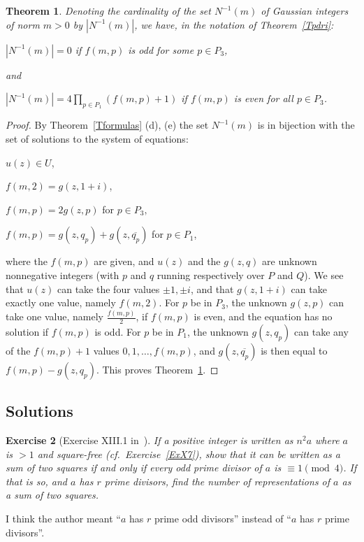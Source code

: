 \documentclass[12pt,letterpaper]{article}
\newtheorem{thm}{Theorem}%
\newtheorem{exer}[thm]{Exercise}
\theoremstyle{definition}
\begin{document}
\begin{thm}\label{TN-1m}
Denoting the cardinality of the set $N^{-1}(m)$ of Gaussian integers of norm $m>0$ by $|N^{-1}(m)|$, we have, in the notation of Theorem~\ref{Tpdri}: 

$|N^{-1}(m)|=0$ if $f(m,p)$ is odd for some $p\in P_3$, 

\noindent and 

$\displaystyle |N^{-1}(m)| = 4 \prod_{p\in P_1} (f(m,p)+1)$ if $f(m,p)$ is even for all $p\in P_3$. 
\end{thm}

\begin{proof}
By Theorem~\ref{Tformulas} (d), (e) the set $N^{-1}(m)$ is in bijection with the set of solutions to the system of equations: 

$u(z)\in U$, 

$f(m,2)=g(z,1+i)$, 

$f(m,p)=2g(z,p)$ for $p\in P_3,$ 

$f(m,p)=g(z,q_p)+g(z,\overline{q_p})$ for $p\in P_1$, 

\noindent where the $f(m,p)$ are given, and $u(z)$ and the $g(z,q)$ are unknown nonnegative integers (with $p$ and $q$ running respectively over $P$ and $Q$). We see that $u(z)$ can take the four values $\pm1,\pm i$, and that $g(z,1+i)$ can take exactly one value, namely $f(m,2)$. For $p$ be in $P_3$, the unknown $g(z,p)$ can take one value, namely $\frac{f(m,p)}{2}$, if $f(m,p)$ is even, and the equation has no solution if $f(m,p)$ is odd. For $p$ be in $P_1$, the unknown $g(z,q_p)$ can take any of the $f(m,p)+1$ values $0,1,\ldots,f(m,p)$, and $g(z,\overline{q_p})$ is then equal to $f(m,p)-g(z,q_p)$. This proves Theorem~\ref{TN-1m}. 
\end{proof}

\subsection{Solutions} %

\begin{exer}[Exercise XIII.1 in~\cite{weil1979}]
If a positive integer is written as $n^2a$ where $a$ is $>1$ and square-free (cf.\ Exercise~\ref{ExX7}), show that it can be written as a sum of two squares if and only if every odd prime divisor of $a$ is $\equiv 1\pmod 4$. If that is so, and $a$ has $r$ prime divisors, find the number of representations of $a$ as a sum of two squares.
\end{exer} 

I think the author meant ``$a$ has $r$ prime odd divisors'' instead of ``$a$ has $r$ prime divisors''. 
\end{document}
